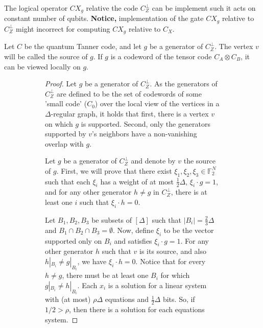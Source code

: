 \begin{claim}
  The logical operator $CX_{g}$ relative the code $C_{Z}^{\perp}$ can be
  implement such it acts on constant number of qubits. \textbf{Notice,}
  implementation of the gate $CX_{g}$ relative to $C_{Z}^{\perp}$ might
  incorrect for computing $CX_{g}$ relative to $C_{X}$.
\end{claim}

\begin{definition}
  Let $C$ be the quantum Tanner code, and let $g$ be a generator of
  $C_{Z}^{\perp}$. The vertex $v$ will be called the source of $g$. If $g$ is a
  codeword of the tensor code $C_{A}\otimes C_{B}$, it can be viewed locally on
  $g$.
\end{definition}

\begin{figure}[h]
  \begin{subfigure}{0.5\textwidth}
    \begin{proof}
      Let $g$ be a generator of $C_{Z}^{\perp}$. As the generators of
      $C_{Z}^\perp$ are defined to be the set of codewords of some 'small code'
      ($C_{0}$) over the local view of the vertices in a $\Delta$-regular
      graph, it
      holds that first, there is a vertex $v$ on which $g$ is supported. Second,
      only the generators supported by $v$'s neighbors have a non-vanishing
      overlap
      with $g$.

      Let $g$ be a generator of $C_{Z}^{\perp}$ and denote by $v$ the source of
      $g$. First, we will prove that there exist $\xi_{1}, \xi_{2}, \xi_{3} \in
      \mathbb{F}_{2}^{N}$ such that each $\xi_{i}$ has a weight of at most
      $\frac{1}{2} \Delta$, $\xi_{i} \cdot g = 1$, and for any other generator
      $h
      \neq g$ in $C_{Z}^{\perp}$, there is at least one $i$ such that $\xi_{i}
      \cdot
      h = 0$.

      Let $B_1, B_2, B_3$ be subsets of $[\Delta]$ such that $|B_i| =
      \frac{2}{3}\Delta$ and $B_1 \cap B_2 \cap B_3 = \emptyset$. Now, define
      $\xi_i$ to be the vector supported only on $B_i$ and satisfies $\xi_i
      \cdot g
      = 1$. For any other generator $h$ such that $v$ is its source, and also
      $h|_{B_{i}} \neq g|_{B_{i}}$, we have $\xi_i \cdot h = 0$. Notice that for
      every $h \neq g$, there must be at least one $B_{i}$ for which $g|_{B_{i}}
      \neq h|_{B_{i}}$. Each $x_{i}$ is a solution for a linear system with (at
      most) $\rho\Delta$ equations and $\frac{1}{2} \Delta$ bits. So, if $1/2 >
      \rho$, then there is a solution for each equations system.


\end{proof}
\end{subfigure}
\end{figure}
